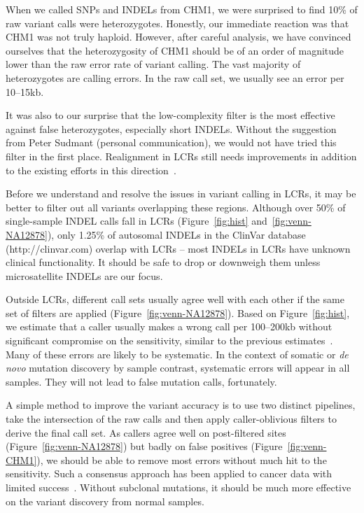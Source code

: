 \documentclass{bioinfo}
\begin{document}
When we called SNPs and INDELs from CHM1, we were surprised to find 10\% of raw
variant calls were heterozygotes. Honestly, our immediate reaction was that
CHM1 was not truly haploid. However, after careful analysis, we have convinced
ourselves that the heterozygosity of CHM1 should be of an order of magnitude
lower than the raw error rate of variant calling. The vast majority of
heterozygotes are calling errors. In the raw call set, we usually see an error
per 10--15kb.

It was also to our surprise that the low-complexity filter is the most
effective against false heterozygotes, especially short INDELs. Without the
suggestion from Peter Sudmant (personal communication), we would not have tried
this filter in the first place. Realignment in LCRs
still needs improvements in addition to the existing efforts in this
direction~\citep{Homer:2010aa,Li:2011kx,Albers:2011aa}.

Before we understand and resolve the issues in variant calling in LCRs,
it may be better to filter out all variants overlapping these regions.
Although over 50\% of single-sample INDEL calls fall in LCRs
(Figure~\ref{fig:hist} and~\ref{fig:venn-NA12878}), only 1.25\% of autosomal
INDELs in the ClinVar database (http://clinvar.com) overlap with LCRs -- most
INDELs in LCRs have unknown clinical functionality. It should be safe to drop or downweigh
them unless microsatellite INDELs are our focus.

Outside LCRs, different call sets usually agree well with each other
if the same set of filters are applied (Figure~\ref{fig:venn-NA12878}). Based
on Figure~\ref{fig:hist}, we estimate that a caller usually makes a wrong call
per 100--200kb without significant compromise on the sensitivity, similar to
the previous estimates~\citep{Bentley:2008cr,Nickles:2012aa}. Many of these
errors are likely to be systematic. In the context of somatic or \emph{de novo}
mutation discovery by sample contrast, systematic errors will appear in all
samples.  They will not lead to false mutation calls, fortunately.

A simple method to improve the variant accuracy is to use two distinct pipelines,
take the intersection of the raw calls and then apply caller-oblivious filters
to derive the final call set. As callers agree well on post-filtered sites
(Figure~\ref{fig:venn-NA12878}) but badly on false positives
(Figure~\ref{fig:venn-CHM1}), we should be able to remove most errors without
much hit to the sensitivity. Such a consensus approach has been applied to
cancer data with limited success~\citep{Lower:2012aa,Goode:2013aa}. Without
subclonal mutations, it should be much more effective on the variant discovery
from normal samples.
\end{document}
